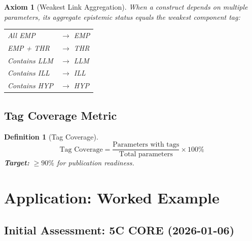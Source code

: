 \documentclass[11pt,a4paper]{article}
\newtheorem{axiom}{Axiom}[section]
\newtheorem{definition}{Definition}[section]
\begin{document}
\begin{axiom}[Weakest Link Aggregation]
When a construct depends on multiple parameters, its aggregate epistemic status equals the \emph{weakest} component tag:
\begin{center}
\begin{tabular}{ll}
All EMP & $\rightarrow$ EMP \\
EMP + THR & $\rightarrow$ THR \\
Contains LLM & $\rightarrow$ LLM \\
Contains ILL & $\rightarrow$ ILL \\
Contains HYP & $\rightarrow$ HYP \\
\end{tabular}
\end{center}
\end{axiom}

\subsection{Tag Coverage Metric}

\begin{definition}[Tag Coverage]
\begin{equation}
\text{Tag Coverage} = \frac{\text{Parameters with tags}}{\text{Total parameters}} \times 100\%
\end{equation}
\textbf{Target:} $\geq 90\%$ for publication readiness.
\end{definition}


\section{Application: Worked Example}
\label{sec:application}

\subsection{Initial Assessment: 5C CORE (2026-01-06)}
\end{document}
